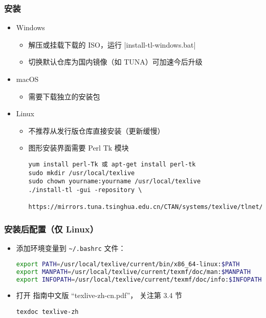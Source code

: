 \begin{frame}[fragile]
  \frametitle{安装 \TL}
  \begin{itemize}
    \item Windows
      \begin{itemize}
        \item 解压或挂载下载的 ISO，运行 |install-tl-windows.bat|
        \item 切换默认仓库为国内镜像（如 TUNA）可加速今后升级
      \end{itemize}
    \item macOS
      \begin{itemize}
        \item 需要下载独立的安装包 
      \end{itemize}
    \item Linux
      \begin{itemize}
        \item 不推荐从发行版仓库直接安装（更新缓慢）
        \item 图形安装界面需要 Perl Tk 模块
          \begin{lstlisting}
yum install perl-Tk 或 apt-get install perl-tk
sudo mkdir /usr/local/texlive
sudo chown yourname:yourname /usr/local/texlive
./install-tl -gui -repository \
  https://mirrors.tuna.tsinghua.edu.cn/CTAN/systems/texlive/tlnet/
        \end{lstlisting}
      \end{itemize}
\end{itemize}
\end{frame}

\begin{frame}[fragile]
  \frametitle{\TL 安装后配置（仅 Linux）}
  \begin{itemize}
    \item
      添加环境变量到 \nolinkurl{~/.bashrc} 文件：
      \begin{lstlisting}[language=bash]
export PATH=/usr/local/texlive/current/bin/x86_64-linux:$PATH
export MANPATH=/usr/local/texlive/current/texmf/doc/man:$MANPATH
export INFOPATH=/usr/local/texlive/current/texmf/doc/info:$INFOPATH
      \end{lstlisting}
  \item
    打开 \TeXLive 指南中文版 “texlive-zh-cn.pdf”，
    关注第 3.4 节
      \begin{lstlisting}[basicstyle=\ttfamily]
texdoc texlive-zh
      \end{lstlisting}
  \end{itemize}
\end{frame}

